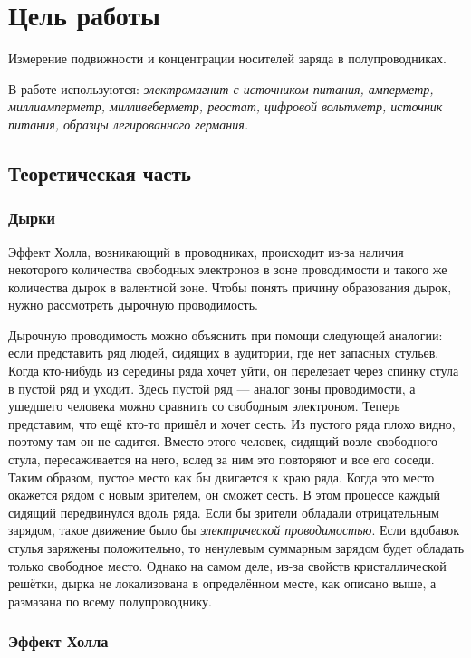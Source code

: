 \documentclass[a4paper, 12pt]{article}
\begin{document}
\section{Цель работы}
Измерение подвижности и концентрации носителей заряда в полупроводниках.

В работе используются: \textit{электромагнит с источником питания, амперметр, миллиамперметр, милливеберметр, реостат, цифровой вольтметр, источник питания, образцы легированного германия.}


\subsection*{Теоретическая часть}

\subsubsection*{Дырки}

Эффект Холла, возникающий в проводниках, происходит из-за наличия некоторого количества свободных электронов в зоне проводимости и такого же количества дырок в валентной зоне. Чтобы понять причину образования дырок, нужно рассмотреть дырочную проводимость.


Дырочную проводимость можно объяснить при помощи следующей аналогии: если представить ряд людей, сидящих в аудитории, где нет запасных стульев. Когда кто-нибудь из середины ряда хочет уйти, он      перелезает через спинку стула в пустой ряд и уходит. Здесь пустой ряд — аналог зоны проводимости, а ушедшего человека можно сравнить со свободным электроном.
Теперь представим, что ещё кто-то пришёл и хочет сесть. Из пустого ряда плохо видно, поэтому там он не садится. Вместо этого человек, сидящий возле свободного стула, пересаживается на него, вслед за ним это повторяют и все его соседи. Таким образом, пустое место как бы двигается к краю ряда. Когда это место окажется рядом с новым зрителем, он сможет сесть.
В этом процессе каждый сидящий передвинулся вдоль ряда. Если бы зрители обладали отрицательным зарядом, такое движение было бы  \textit{электрической проводимостью}. Если вдобавок стулья заряжены положительно, то ненулевым суммарным зарядом будет обладать только свободное место. Однако на самом деле, из-за свойств кристаллической решётки, дырка не локализована в определённом месте, как описано выше, а размазана по всему полупроводнику.

\subsubsection*{Эффект Холла}
\end{document}
